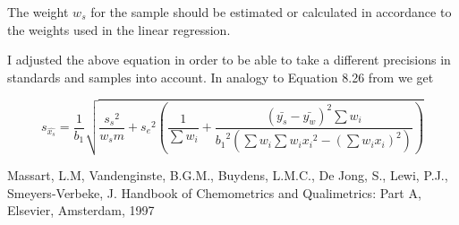 \documentclass[a4paper]{article}
\begin{document}
The weight $w_s$ for the sample should be estimated or calculated in accordance
to the weights used in the linear regression. 

I adjusted the above equation in order to be able to take a different
precisions in standards and samples into account. In analogy to Equation 8.26
from \cite{massart97} we get

\begin{equation}
s_{\hat{x_s}} = \frac{1}{b_1} \sqrt{\frac{{s_s}^2}{w_s m} + 
    {s_e}^2 \left( \frac{1}{\sum{w_i}} +
        \frac{(\bar{y_s} - \bar{y_w})^2 \sum{w_i}}
            {{b_1}^2 \left( \sum{w_i} \sum{w_i {x_i}^2} - {\left( \sum{ w_i x_i } \right)}^2 \right) } \right) }
\end{equation}

\begin{thebibliography}{1}
Massart, L.M, Vandenginste, B.G.M., Buydens, L.M.C., De Jong, S., Lewi, P.J.,
Smeyers-Verbeke, J. 
\newblock Handbook of Chemometrics and Qualimetrics: Part A,
\newblock Elsevier, Amsterdam, 1997
\end{thebibliography}
\end{document}
